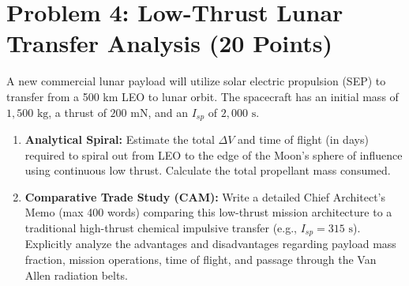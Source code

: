\documentclass[11pt, letterpaper]{article}
\begin{document}
\section*{Problem 4: Low-Thrust Lunar Transfer Analysis (20 Points)}
A new commercial lunar payload will utilize solar electric propulsion (SEP) to transfer from a 500 km LEO to lunar orbit. The spacecraft has an initial mass of $1,500 \text{ kg}$, a thrust of $200 \text{ mN}$, and an $I_{sp}$ of $2,000 \text{ s}$.
\begin{enumerate}
    \item[(a)] \textbf{Analytical Spiral:} Estimate the total $\Delta V$ and time of flight (in days) required to spiral out from LEO to the edge of the Moon's sphere of influence using continuous low thrust. Calculate the total propellant mass consumed.
    \item[(b)] \textbf{Comparative Trade Study (CAM):} Write a detailed Chief Architect's Memo (max 400 words) comparing this low-thrust mission architecture to a traditional high-thrust chemical impulsive transfer (e.g., $I_{sp} = 315 \text{ s}$). Explicitly analyze the advantages and disadvantages regarding payload mass fraction, mission operations, time of flight, and passage through the Van Allen radiation belts. 
\end{enumerate}
\end{document}
